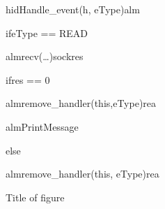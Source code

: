 \documentclass[Main]{subfiles}
\begin{document}
\newpage
\begin{figure}
\begin {sequencediagram}

	\begin{messcall}{hid}{Handle\_event(h, eType)}{alm}

		\begin{sdblock}{if}{eType == READ}
			\begin{call}{alm}{recv(\dots)}{sock}{res}
			\end{call}

			\begin{sdblock}{if}{res == 0}
				\begin{messcall}{alm}{remove\_handler(this,eType)}{rea}
				\end{messcall}


			\end{sdblock}

			\begin{callself}{alm}{PrintMessage}{}
			\end{callself}
		\end{sdblock}

		\begin{sdblock}{else}{}
			\begin{call}{alm}{remove\_handler(this, eType)}{rea}{}
			\end{call}
		\end{sdblock}

	\end{messcall}



\end{sequencediagram}

\caption{Title of figure}
\label{fig:alarmEventHandler}
\end{figure}
\end{document}
